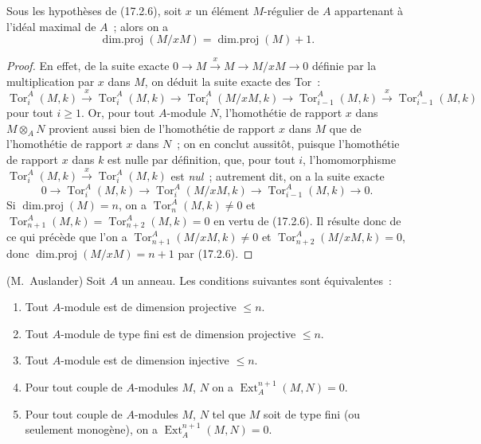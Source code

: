 \begin{corollary}[17.2.7]
\label{0.17.2.7-fr}
Sous les hypothèses de (17.2.6), soit $x$ un élément $M$-régulier de $A$
appartenant à l'idéal maximal de $A$~; alors on a
\begin{equation}
\label{0.17.2.7.1-fr}
\tag{17.2.7.1}
  \operatorname{dim.proj}(M/xM)=\operatorname{dim.proj}(M)+1.
\end{equation}
\end{corollary}

\begin{proof}
En effet, de la suite exacte
$0\longrightarrow M\xrightarrow{x}M\longrightarrow M/xM\longrightarrow0$
définie par la multiplication par $x$ dans $M$, on déduit la suite exacte des
Tor~:
\[
  \operatorname{Tor}^A_i(M,k)\xrightarrow{x}
  \operatorname{Tor}^A_i(M,k)\longrightarrow
  \operatorname{Tor}^A_i(M/xM,k)\longrightarrow
  \operatorname{Tor}^A_{i-1}(M,k)\xrightarrow{x}
  \operatorname{Tor}^A_{i-1}(M,k)
\]
pour tout $i\geq1$. Or, pour tout $A$-module $N$, l'homothétie de rapport $x$
dans $M\otimes_A N$ provient aussi bien de l'homothétie de rapport $x$ dans
$M$ que de l'homothétie de rapport $x$ dans $N$~; on en conclut aussitôt,
puisque l'homothétie de rapport $x$ dans $k$ est nulle par définition, que,
pour tout $i$, l'homomorphisme
$\operatorname{Tor}^A_i(M,k)\xrightarrow{x}\operatorname{Tor}^A_i(M,k)$ est
\emph{nul}~; autrement dit, on a la suite exacte
\[
  0\longrightarrow\operatorname{Tor}^A_i(M,k)\longrightarrow
  \operatorname{Tor}^A_i(M/xM,k)\longrightarrow
  \operatorname{Tor}^A_{i-1}(M,k)\longrightarrow0.
\]
Si $\operatorname{dim.proj}(M)=n$, on a
$\operatorname{Tor}^A_n(M,k)\neq0$ et
$\operatorname{Tor}^A_{n+1}(M,k)=\operatorname{Tor}^A_{n+2}(M,k)=0$ en vertu
de (17.2.6). Il résulte donc de ce qui précède que l'on a
$\operatorname{Tor}^A_{n+1}(M/xM,k)\neq0$ et
$\operatorname{Tor}^A_{n+2}(M/xM,k)=0$, donc
$\operatorname{dim.proj}(M/xM)=n+1$ par (17.2.6).
\end{proof}

\begin{proposition}[17.2.8]
\label{0.17.2.8-fr}
\textnormal{(M.~Auslander)} Soit $A$ un anneau. Les conditions suivantes sont
équivalentes~:
\begin{enumerate}
  \item[\rm a)] Tout $A$-module est de dimension projective $\leq n$.
  \item[\rm a')] Tout $A$-module de type fini est de dimension projective
  $\leq n$.
  \item[\rm b)] Tout $A$-module est de dimension injective $\leq n$.
  \item[\rm c)] Pour tout couple de $A$-modules $M$, $N$ on a
  $\operatorname{Ext}^{n+1}_A(M,N)=0$.
  \item[\rm c')] Pour tout couple de $A$-modules $M$, $N$ tel que $M$ soit de
  type fini (ou seulement monogène), on a
  $\operatorname{Ext}^{n+1}_A(M,N)=0$.
\end{enumerate}
\end{proposition}

